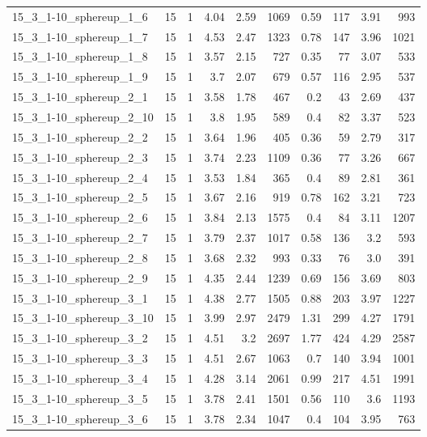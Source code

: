 \begin{center}
\begin{scriptsize}
\begin{longtable}{lrrrrrrrrr}
15\_3\_1-10\_sphereup\_1\_6 & 15 & 1 & 4.04 & 2.59 & 1069 & 0.59 & 117 & 3.91 & 993\\
15\_3\_1-10\_sphereup\_1\_7 & 15 & 1 & 4.53 & 2.47 & 1323 & 0.78 & 147 & 3.96 & 1021\\
15\_3\_1-10\_sphereup\_1\_8 & 15 & 1 & 3.57 & 2.15 & 727 & 0.35 & 77 & 3.07 & 533\\
15\_3\_1-10\_sphereup\_1\_9 & 15 & 1 & 3.7 & 2.07 & 679 & 0.57 & 116 & 2.95 & 537\\
15\_3\_1-10\_sphereup\_2\_1 & 15 & 1 & 3.58 & 1.78 & 467 & 0.2 & 43 & 2.69 & 437\\
15\_3\_1-10\_sphereup\_2\_10 & 15 & 1 & 3.8 & 1.95 & 589 & 0.4 & 82 & 3.37 & 523\\
15\_3\_1-10\_sphereup\_2\_2 & 15 & 1 & 3.64 & 1.96 & 405 & 0.36 & 59 & 2.79 & 317\\
15\_3\_1-10\_sphereup\_2\_3 & 15 & 1 & 3.74 & 2.23 & 1109 & 0.36 & 77 & 3.26 & 667\\
15\_3\_1-10\_sphereup\_2\_4 & 15 & 1 & 3.53 & 1.84 & 365 & 0.4 & 89 & 2.81 & 361\\
15\_3\_1-10\_sphereup\_2\_5 & 15 & 1 & 3.67 & 2.16 & 919 & 0.78 & 162 & 3.21 & 723\\
15\_3\_1-10\_sphereup\_2\_6 & 15 & 1 & 3.84 & 2.13 & 1575 & 0.4 & 84 & 3.11 & 1207\\
15\_3\_1-10\_sphereup\_2\_7 & 15 & 1 & 3.79 & 2.37 & 1017 & 0.58 & 136 & 3.2 & 593\\
15\_3\_1-10\_sphereup\_2\_8 & 15 & 1 & 3.68 & 2.32 & 993 & 0.33 & 76 & 3.0 & 391\\
15\_3\_1-10\_sphereup\_2\_9 & 15 & 1 & 4.35 & 2.44 & 1239 & 0.69 & 156 & 3.69 & 803\\
15\_3\_1-10\_sphereup\_3\_1 & 15 & 1 & 4.38 & 2.77 & 1505 & 0.88 & 203 & 3.97 & 1227\\
15\_3\_1-10\_sphereup\_3\_10 & 15 & 1 & 3.99 & 2.97 & 2479 & 1.31 & 299 & 4.27 & 1791\\
15\_3\_1-10\_sphereup\_3\_2 & 15 & 1 & 4.51 & 3.2 & 2697 & 1.77 & 424 & 4.29 & 2587\\
15\_3\_1-10\_sphereup\_3\_3 & 15 & 1 & 4.51 & 2.67 & 1063 & 0.7 & 140 & 3.94 & 1001\\
15\_3\_1-10\_sphereup\_3\_4 & 15 & 1 & 4.28 & 3.14 & 2061 & 0.99 & 217 & 4.51 & 1991\\
15\_3\_1-10\_sphereup\_3\_5 & 15 & 1 & 3.78 & 2.41 & 1501 & 0.56 & 110 & 3.6 & 1193\\
15\_3\_1-10\_sphereup\_3\_6 & 15 & 1 & 3.78 & 2.34 & 1047 & 0.4 & 104 & 3.95 & 763\\

\end{longtable}
\end{scriptsize}
\end{center}
